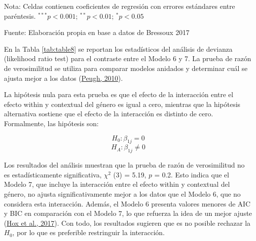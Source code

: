 \documentclass[
  12pt,
  a4paper,
]{article}
\begin{document}
\begin{table}[H]
\begin{center}
{\begin{threeparttable}
\begin{tablenotes}[flushleft]
\scriptsize{\item Nota: Celdas contienen coeficientes de regresión con errores estándares entre paréntesis. $^{***}p<0.001$; $^{**}p<0.01$; $^{*}p<0.05$ \\ \item Fuente: Elaboración propia en base a datos de Bressoux 2017}
\end{tablenotes}
\end{threeparttable}
}
\caption{\label{tab:table7} Modelos multinivel para puntaje en prueba de francés según efectos within y contextuales del género}
\label{table:coefficients}
\end{center}
\end{table}

En la Tabla \ref{tab:table8} se reportan los estadísticos del análisis de devianza (likelihood ratio test) para el contraste entre el Modelo 6 y 7. La prueba de razón de verosimilitud se utiliza para comparar modelos anidados y determinar cuál se ajusta mejor a los datos (\protect\hyperlink{ref-peugh_practical_2010}{Peugh, 2010}).

La hipótesis nula para esta prueba es que el efecto de la interacción entre el efecto within y contextual del género es igual a cero, mientras que la hipótesis alternativa sostiene que el efecto de la interacción es distinto de cero. Formalmente, las hipótesis son:

\[
H_0 : \beta_{1j} = 0
\]
\[
H_A : \beta_{1j} \neq 0
\]

Los resultados del análisis muestran que la prueba de razón de verosimilitud no es estadísticamente significativa, \(\chi^2\) (3) = 5.19, \(p\) = 0.2. Esto indica que el Modelo 7, que incluye la interacción entre el efecto within y contextual del género, no ajusta significativamente mejor a los datos que el Modelo 6, que no considera esta interacción. Además, el Modelo 6 presenta valores menores de AIC y BIC en comparación con el Modelo 7, lo que refuerza la idea de un mejor ajuste (\protect\hyperlink{ref-hox_multilevel_2017a}{Hox et al., 2017}). Con todo, los resultados sugieren que es no posible rechazar la \(H_0\), por lo que es preferible restringuir la interacción.
\end{document}
